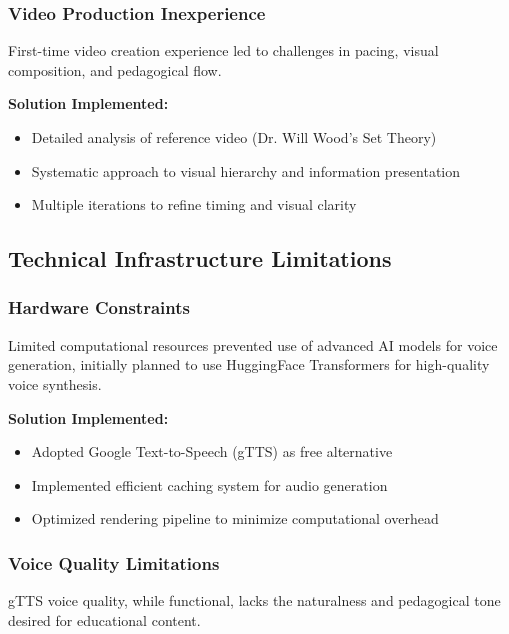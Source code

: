 \documentclass[12pt,a4paper]{article}
\begin{document}
\subsubsection{Video Production Inexperience}
\begin{tcolorbox}[colback=red!5!white,colframe=red!75!black,title=Challenge]
First-time video creation experience led to challenges in pacing, visual composition, and pedagogical flow.
\end{tcolorbox}

\textbf{Solution Implemented:}
\begin{itemize}
    \item Detailed analysis of reference video (Dr. Will Wood's Set Theory)
    \item Systematic approach to visual hierarchy and information presentation
    \item Multiple iterations to refine timing and visual clarity
\end{itemize}

\subsection{Technical Infrastructure Limitations}

\subsubsection{Hardware Constraints}
\begin{tcolorbox}[colback=red!5!white,colframe=red!75!black,title=Challenge]
Limited computational resources prevented use of advanced AI models for voice generation, initially planned to use HuggingFace Transformers for high-quality voice synthesis.
\end{tcolorbox}

\textbf{Solution Implemented:}
\begin{itemize}
    \item Adopted Google Text-to-Speech (gTTS) as free alternative
    \item Implemented efficient caching system for audio generation
    \item Optimized rendering pipeline to minimize computational overhead
\end{itemize}

\subsubsection{Voice Quality Limitations}
\begin{tcolorbox}[colback=orange!5!white,colframe=orange!75!black,title=Challenge]
gTTS voice quality, while functional, lacks the naturalness and pedagogical tone desired for educational content.
\end{tcolorbox}
\end{document}
